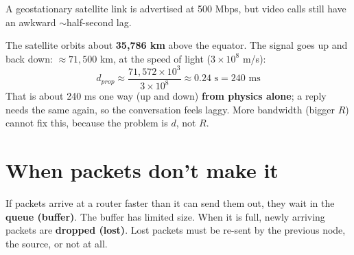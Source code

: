 \begin{workedex}
A geostationary satellite link is advertised at 500 Mbps, but video calls still have an awkward $\sim$half-second lag.

The satellite orbits about \textbf{35{,}786 km} above the equator. The signal goes up and back down: $\approx 71{,}500$ km, at the speed of light ($3\times 10^8$ m/s):
\[ d_{prop} \approx \frac{71{,}572 \times 10^3}{3\times 10^8} \approx 0.24 \text{ s} = 240 \text{ ms} \]
That is about 240 ms one way (up and down) \textbf{from physics alone}; a reply needs the same again, so the conversation feels laggy. More bandwidth (bigger $R$) cannot fix this, because the problem is $d$, not $R$.
\end{workedex}

\begin{center}
\end{center}

\section{When packets don't make it}
If packets arrive at a router faster than it can send them out, they wait in the \textbf{queue (buffer)}. The buffer has limited size. When it is full, newly arriving packets are \textbf{dropped (lost)}. Lost packets must be re-sent by the previous node, the source, or not at all.

\begin{center}
\end{center}

